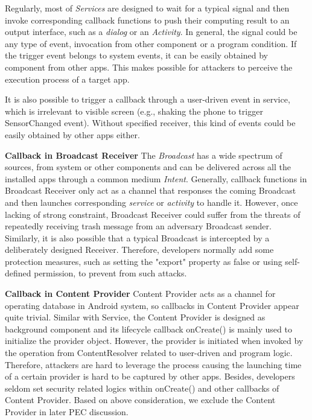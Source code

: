 \documentclass{sig-alternate-05-2015}
\begin{document}
Regularly, most of \textit{Services} are designed to wait for a typical signal and then invoke corresponding callback functions to push their computing result to an output interface, such as a \textit{dialog} or an \textit{Activity}. In general, the signal could be any type of event, invocation from other component or a program condition. If the trigger event belongs to system events, it can be easily obtained by component from other apps. This makes possible for attackers to perceive the execution process of a target app.

It is also possible to trigger a callback through a user-driven event in service, which is irrelevant to visible screen (e.g., shaking the phone to trigger SensorChanged event). Without specified receiver, this kind of events could be easily obtained by other apps either.   

\textbf{Callback in Broadcast Receiver} 
The \textit{Broadcast} has a wide spectrum of sources, from system or other components and can be delivered across all the installed apps through a common medium \textit{Intent}. Generally, callback functions in Broadcast Receiver only act as a channel that responses the coming Broadcast and then launches corresponding \textit{service} or \textit{activity} to handle it. However, once lacking of strong constraint, Broadcast Receiver could suffer from the threats of repeatedly receiving trash message from an adversary Broadcast sender. Similarly, it is also possible that a typical Broadcast is intercepted by a deliberately designed Receiver. Therefore, developers normally add some protection measures, such as setting the "export" property as false or using self-defined permission, to prevent from such attacks.

\textbf{Callback in Content Provider}
Content Provider acts as a channel for operating database in Android system, so callbacks in Content Provider appear quite trivial. Similar with Service, the Content Provider is designed as background component and its lifecycle callback onCreate() is mainly used to initialize the provider object. However, the provider is initiated when invoked by the operation from ContentResolver related to user-driven and program logic. Therefore, attackers are hard to leverage the process causing the launching time of a certain provider is hard to be captured by other apps. Besides, developers seldom set security related logics within onCreate() and other callbacks of Content Provider. Based on above consideration, we exclude the Content Provider in later PEC discussion.
\end{document}
